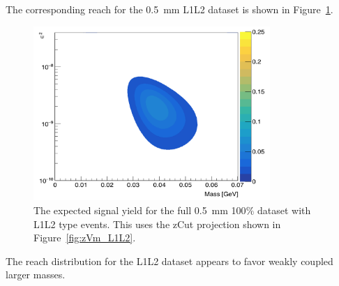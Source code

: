 The corresponding reach for the 0.5~mm L1L2 dataset is shown in Figure~\ref{fig:reachl1l2}.

\begin{figure}[H]
  \centering
     \includegraphics[width=0.8\textwidth]{plots/reachL1L2.png}
  \caption{The expected signal yield for the full 0.5~mm 100$\%$ dataset with L1L2 type events. This uses the zCut projection shown in Figure~\ref{fig:zVm_L1L2}.}
  \label{fig:reachl1l2}
\end{figure} 

The reach distribution for the L1L2 dataset appears to favor weakly coupled larger masses. 
